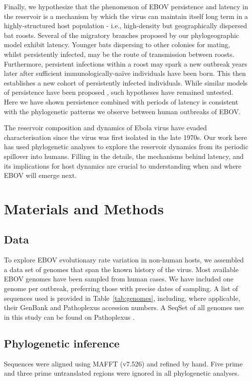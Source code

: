 \documentclass[11pt,a4paper]{article}
\begin{document}
Finally, we hypothesize that the phenomenon of EBOV persistence and latency in the reservoir is a mechanism by which the virus can maintain itself long term in a highly-structured host population - i.e., high-density but geographically dispersed bat roosts.
Several of the migratory branches proposed by our phylogeographic model exhibit latency.
Younger bats dispersing to other colonies for mating, whilst persistently infected, may be the route of transmission between roosts.
Furthermore, persistent infections within a roost may spark a new outbreak years later after sufficient immunologically-naïve individuals have been born.
This then establishes a new cohort of persistently infected individuals.
While similar models of persistence have been proposed \cite{Sundaram2025-gi,Plowright2016-ep}, such hypotheses have remained untested.
Here we have shown persistence combined with periods of latency is consistent with the phylogenetic patterns we observe between human outbreaks of EBOV.

The reservoir composition and dynamics of Ebola virus have evaded characterisation since the virus was first isolated in the late 1970s.
Our work here has used phylogenetic analyses to explore the reservoir dynamics from its periodic spillover into humans.
Filling in the details, the mechanisms behind latency, and its implications for host dynamics are crucial to understanding when and where EBOV will emerge next.

\section*{Materials and Methods}

\subsection*{Data}

To explore EBOV evolutionary rate variation in non-human hosts, we assembled a data set of genomes that span the known history of the virus.
Most available EBOV genomes have been sampled from human cases.
We have included one genome per outbreak, preferring those with precise dates of sampling.
A list of sequences used is provided in Table~\ref{tab:genomes}, including, where applicable, their GenBank and Pathoplexus accession numbers.
A SeqSet of all genomes use in this study can be found on Pathoplexus \cite{PP_SS_1057_2}.

\subsection*{Phylogenetic inference}
Sequences were aligned using MAFFT (v7.526) \cite{Katoh2013-ll} and refined by hand. 
Five prime and three prime untranslated regions were ignored in all phylogenetic analyses.
\end{document}
